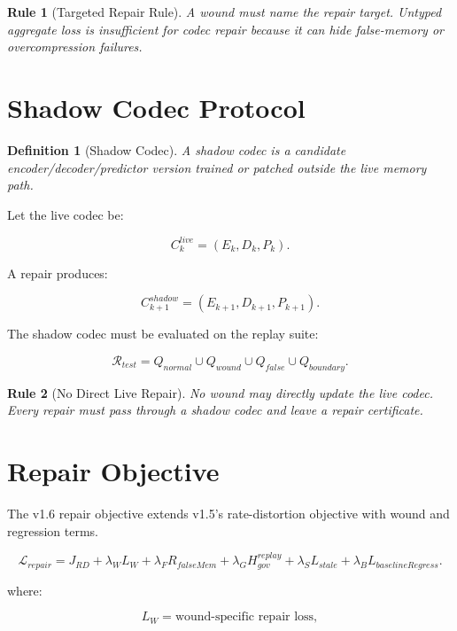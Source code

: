 \documentclass[12pt]{article}
\newtheorem{definition}{Definition}
\newtheorem{rulebox}{Rule}
\begin{document}
\begin{rulebox}[Targeted Repair Rule]
A wound must name the repair target. Untyped aggregate loss is insufficient for
codec repair because it can hide false-memory or overcompression failures.
\end{rulebox}

\section{Shadow Codec Protocol}

\begin{definition}[Shadow Codec]
A shadow codec is a candidate encoder/decoder/predictor version trained or
patched outside the live memory path.
\end{definition}

Let the live codec be:

\[
C^{live}_k=(E_k,D_k,P_k).
\]

A repair produces:

\[
C^{shadow}_{k+1}=(E_{k+1},D_{k+1},P_{k+1}).
\]

The shadow codec must be evaluated on the replay suite:

\[
\mathcal{R}_{test}=Q_{normal}\cup Q_{wound}\cup Q_{false}\cup Q_{boundary}.
\]

\begin{rulebox}[No Direct Live Repair]
No wound may directly update the live codec. Every repair must pass through a
shadow codec and leave a repair certificate.
\end{rulebox}

\section{Repair Objective}

The v1.6 repair objective extends v1.5's rate-distortion objective with wound
and regression terms.

\[
\boxed{
\mathcal{L}_{repair}
=
J_{RD}
+
\lambda_W L_W
+
\lambda_F R_{falseMem}
+
\lambda_G H^{replay}_{gov}
+
\lambda_S L_{stale}
+
\lambda_B L_{baselineRegress}.
}
\]

where:

\[
L_W=\text{wound-specific repair loss},
\]
\end{document}
